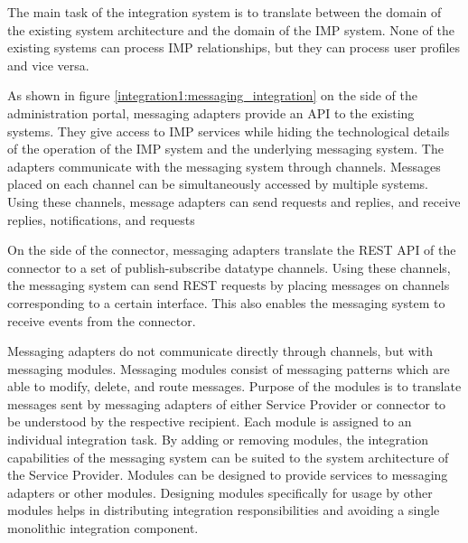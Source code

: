 The main task of the integration system is to translate between the domain of the existing system architecture and the domain of the IMP system. None of the existing systems can process IMP relationships, but they can process user profiles and vice versa. 

As shown in figure \ref{integration1:messaging_integration} on the side of the administration portal, messaging adapters provide an API to the existing systems. They give access to IMP services while hiding the technological details of the operation of the IMP system and the underlying messaging system. The adapters communicate with the messaging system through channels. Messages placed on each channel can be simultaneously accessed by multiple systems. Using these channels, message adapters can send requests and replies, and receive replies, notifications, and requests

On the side of the connector, messaging adapters translate the REST API of the connector to a set of publish-subscribe datatype channels. Using these channels, the messaging system can send REST requests by placing messages on channels corresponding to a certain interface. This also enables the messaging system to receive events from the connector.

Messaging adapters do not communicate directly through channels, but with messaging modules. Messaging modules consist of messaging patterns which are able to modify, delete, and route messages. Purpose of the modules is to translate messages sent by messaging adapters of either Service Provider or connector to be understood by the respective recipient. Each module is assigned to an individual integration task. By adding or removing modules, the integration capabilities of the messaging system can be suited to the system architecture of the Service Provider. Modules can be designed to provide services to messaging adapters or other modules. Designing modules specifically for usage by other modules helps in distributing integration responsibilities and avoiding a single monolithic integration component.

